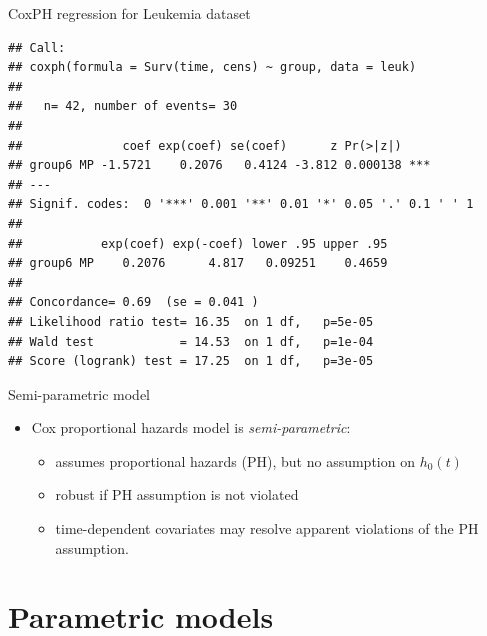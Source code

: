 \documentclass[
  ignorenonframetext,
]{beamer}
\providecommand{\tightlist}{%
  \setlength{\itemsep}{0pt}\setlength{\parskip}{0pt}}
\begin{document}
\begin{frame}[fragile]{CoxPH regression for Leukemia dataset}
\protect\hypertarget{coxph-regression-for-leukemia-dataset}{}

\tiny

\begin{verbatim}
## Call:
## coxph(formula = Surv(time, cens) ~ group, data = leuk)
## 
##   n= 42, number of events= 30 
## 
##              coef exp(coef) se(coef)      z Pr(>|z|)    
## group6 MP -1.5721    0.2076   0.4124 -3.812 0.000138 ***
## ---
## Signif. codes:  0 '***' 0.001 '**' 0.01 '*' 0.05 '.' 0.1 ' ' 1
## 
##           exp(coef) exp(-coef) lower .95 upper .95
## group6 MP    0.2076      4.817   0.09251    0.4659
## 
## Concordance= 0.69  (se = 0.041 )
## Likelihood ratio test= 16.35  on 1 df,   p=5e-05
## Wald test            = 14.53  on 1 df,   p=1e-04
## Score (logrank) test = 17.25  on 1 df,   p=3e-05
\end{verbatim}

\end{frame}

\begin{frame}{Semi-parametric model}
\protect\hypertarget{semi-parametric-model}{}

\begin{itemize}
\tightlist
\item
  Cox proportional hazards model is \emph{semi-parametric}:

  \begin{itemize}
  \tightlist
  \item
    assumes proportional hazards (PH), but no assumption on \(h_0(t)\)
  \item
    robust if PH assumption is not violated
  \item
    time-dependent covariates may resolve apparent violations of the PH
    assumption.
  \end{itemize}
\end{itemize}

\end{frame}

\hypertarget{parametric-models}{%
\section{Parametric models}\label{parametric-models}}
\end{document}
